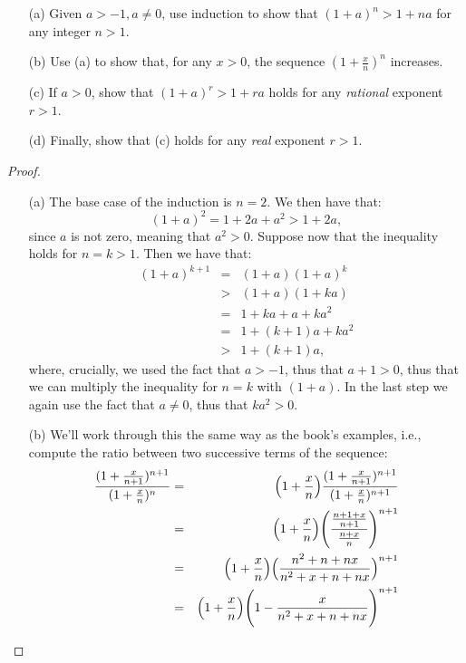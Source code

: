 \begin{exercise}{18}
\begin{enumerate}
    \item[(a)] Given $a > -1, a \neq 0$, use induction to show that $(1+a)^n > 1 +na$ for any integer $n > 1$.
    \item[(b)] Use (a) to show that, for any $x > 0$, the sequence $(1 + \frac{x}{n})^n$ increases.
    \item[(c)] If $a > 0$, show that $(1+a)^r > 1 + ra$ holds for any \textit{rational} exponent $r > 1$.
    \item[(d)] Finally, show that (c) holds for any \textit{real} exponent $r > 1$.
\end{enumerate}
\end{exercise}
\begin{proof}
    \begin{enumerate}
        \item[(a)] The base case of the induction is $n = 2$. We then have that:
    $$(1 +a)^2 = 1 + 2a + a^2 > 1 + 2a,$$
    since $a$ is not zero, meaning that $a^2 > 0$. Suppose now that the inequality holds for $n = k > 1$. Then we have that:
    \begin{eqnarray*}
        (1 +a)^{k+1} 
        & = & (1+a)(1+a)^k\\
        & > & (1+a)(1 +ka)\\
        & = & 1 + ka + a + ka^2\\
        & = & 1 + (k+1)a +ka^2\\
        & > & 1 + (k+1)a,
    \end{eqnarray*}
    where, crucially, we used the fact that $a > -1$, thus that $a + 1 > 0$, thus that we can multiply the inequality for $n = k$ with $(1+a)$. In the last step we again use the fact that $a \neq 0$, thus that $ka^2 > 0$.
    \item[(b)] We'll work through this the same way as the book's examples, i.e., compute the ratio between two successive terms of the sequence:
    \begin{eqnarray*}
        \frac{(1+\frac{x}{n+1})^{n+1}}{(1+\frac{x}{n})^n} 
        & = & \Bigl(1+\frac{x}{n}\Bigr)\frac{(1+\frac{x}{n+1})^{n+1}}{(1+\frac{x}{n})^{n+1}}\\
        & = & \Bigl(1+\frac{x}{n}\Bigr)\Biggl(\frac{\frac{n+1+x}{n+1}}{\frac{n+x}{n}}\Biggr)^{n+1}\\
        & = & \Bigl(1+\frac{x}{n}\Bigr)\Bigl(\frac{n^2+n+nx}{n^2+x+n+nx}\Bigr)^{n+1}\\
        & = & \Bigl(1+\frac{x}{n}\Bigr)\Biggl(1 - \frac{x}{n^2+x+n+nx}\Biggr)^{n+1}\\

\end{eqnarray*}
\end{enumerate}
\end{proof}
